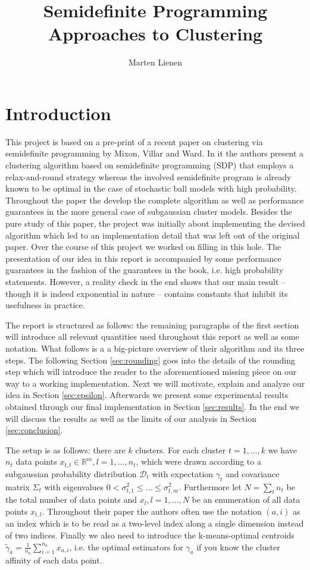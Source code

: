 \documentclass[10pt,a4paper]{article}
\title{Semidefinite Programming Approaches to Clustering}
\author{Marten Lienen}
\date{}
\begin{document}
\maketitle

\section{Introduction}

This project is based on a pre-print of a recent paper on clustering via semidefinite programming \cite{sdp} by Mixon, Villar and Ward.
In it the authors present a clustering algorithm based on semidefinite programming (SDP) that employs a relax-and-round strategy whereas the involved semidefinite program is already known to be optimal in the case of stochastic ball models with high probability.
Throughout the paper the develop the complete algorithm as well as performance guarantees in the more general case of subgaussian cluster models.
Besides the pure study of this paper, the project was initially about implementing the devised algorithm which led to an implementation detail that was left out of the original paper.
Over the course of this project we worked on filling in this hole.
The presentation of our idea in this report is accompanied by some performance guarantees in the fashion of the guarantees in the book, i.e. high probability statements.
However, a reality check in the end shows that our main result -- though it is indeed exponential in nature -- contains constants that inhibit its usefulness in practice.

The report is structured as follows: the remaining paragraphs of the first section will introduce all relevant quantities used throughout this report as well as some notation.
What follows is a a big-picture overview of their algorithm and its three steps.
The following Section \ref{sec:rounding} goes into the details of the rounding step which will introduce the reader to the aforementioned missing piece on our way to a working implementation.
Next we will motivate, explain and analyze our idea in Section \ref{sec:epsilon}.
Afterwards we present some experimental results obtained through our final implementation in Section \ref{sec:results}.
In the end we will discuss the results as well as the limits of our analysis in Section \ref{sec:conclusion}.

The setup is as follows: there are $k$ clusters.
For each cluster $t = 1, \dots, k$ we have $n_{t}$ data points $x_{t, l} \in \mathbb{R}^{m}, l = 1, \dots, n_{t}$, which were drawn according to a subgaussian probability distribution $\mathcal{D}_{t}$ with expectation $\gamma_{t}$ and covariance matrix $\Sigma_{t}$ with eigenvalues $0 < \sigma_{t, 1}^{2} \le \dots \le \sigma_{t, m}^{2}$.
Furthermore let $N = \sum_{t} n_{t}$ be the total number of data points and $x_{l}, l = 1, \dots, N$ be an enumeration of all data points $x_{t, l}$.
Throughout their paper the authors often use the notation $(a, i)$ as an index which is to be read as a two-level index along a single dimension instead of two indices.
Finally we also need to introduce the k-means-optimal centroids $\tilde{\gamma}_{a} = \frac{1}{n_{a}} \sum_{i = 1}^{n_{a}} x_{a, i}$, i.e. the optimal estimators for $\gamma_{a}$ if you know the cluster affinity of each data point.
\end{document}
